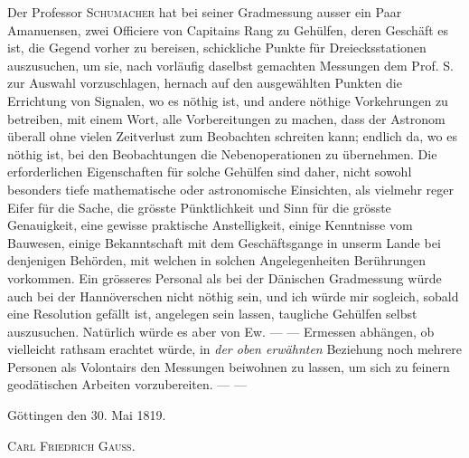 Der Professor \textsc{Schumacher} hat bei seiner Gradmessung ausser ein Paar Amanuensen, zwei Officiere von Capitains Rang zu Gehülfen, deren Geschäft es ist, die Gegend vorher zu bereisen, schickliche Punkte für Dreiecksstationen auszusuchen, um sie, nach vorläufig daselbst gemachten Messungen dem Prof. S. zur Auswahl vorzuschlagen, hernach auf den ausgewählten Punkten die Errichtung von Signalen, wo es nöthig ist, und andere nöthige Vorkehrungen zu betreiben, mit einem Wort, alle Vorbereitungen zu machen, dass der Astronom überall ohne vielen Zeitverlust zum Beobachten schreiten kann; endlich da, wo es nöthig ist, bei den Beobachtungen die Nebenoperationen zu übernehmen. Die erforderlichen Eigenschaften für solche Gehülfen sind daher, nicht sowohl besonders tiefe mathematische oder astronomische Einsichten, als vielmehr reger Eifer für die Sache, die grösste Pünktlichkeit und Sinn für die grösste Genauigkeit, eine gewisse praktische Anstelligkeit, einige Kenntnisse vom Bauwesen, einige Bekanntschaft mit dem Geschäftsgange in unserm Lande bei denjenigen Behörden, mit welchen in solchen Angelegenheiten Berührungen vorkommen. Ein grösseres Personal als bei der Dänischen Gradmessung würde auch bei der Hannöverschen nicht nöthig sein, und ich würde mir sogleich, sobald eine Resolution gefällt ist, angelegen sein lassen, taugliche Gehülfen selbst auszusuchen. Natürlich würde es aber von Ew. — — Ermessen abhängen, ob vielleicht rathsam erachtet würde, in \textit{der oben erwähnten} Beziehung noch mehrere Personen als Volontairs den Messungen beiwohnen zu lassen, um sich zu feinern geodätischen Arbeiten vorzubereiten. — —

Göttingen den 30. Mai 1819.
\begin{flushright}\textsc{Carl Friedrich Gauss}.\end{flushright}
